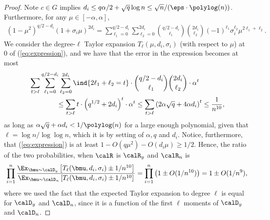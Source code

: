 \begin{proof}
Note $c \in G$ implies $d_i \leq q \alpha/2 + \sqrt{q} \log n \leq \sqrt{n} / (\eps \cdot \polylog(n))$. 
        Furthermore, for any $\mu \in [-\alpha, \alpha]$, %
    \begin{align}
    \left(1 - \mu^2\right)^{q/2 - d_i}\left(1+ \sigma_i \mu\right)^{2d_i} = \sum_{\ell_1 = 0}^{q/2-d_i} \sum_{\ell_2 = 0}^{2d_i} \binom{q/2-d_i}{\ell_1} \binom{2d_i}{\ell_2} (-1)^{\ell_1} \sigma_i^{\ell_2} \mu^{2\ell_1 + \ell_2}. \label{eq:expression} \end{align}
    We consider the degree-$\ell$ Taylor expansion $T_{\ell}(\mu,d_i,\sigma_i)$ (with respect to $\mu$) at $0$ of (\ref{eq:expression}), and we have that the error in the expression becomes at most
    \begin{align*} 
    &\sum_{t > \ell} \sum_{\ell_1=0}^{q/2-d_i} \sum_{\ell_2=0}^{2d_i} \ind\{ 2\ell_1 + \ell_2 = t \} \cdot \binom{q/2-d_i}{\ell_1} \binom{2d_i}{\ell_2} \cdot \alpha^{t} \\
        &\qquad\qquad \leq \sum_{t > \ell} t\cdot \left( q^{1/2} + 2d_i\right)^{t} \cdot \alpha^{t} \leq \sum_{t > \ell} \left( 2\alpha \sqrt{q} + 4\alpha d_i  \right)^{t} %
        \leq \frac{1}{n^{10}},
    \end{align*}
    as long as $\alpha \sqrt{q} + \alpha d_i < 1 / \polylog(n)$ for a large enough polynomial, given that $\ell=\log n / \log \log n $, which it is by setting of $\alpha, q$ and $d_i$. Notice, furthermore, that (\ref{eq:expression}) is at least $1 - O(q\mu^2) - O(d_i \mu) \geq 1/2$. Hence, the ratio of the two probabilities, when $\calR$ is $\calR_y$ and $\calR_n$ is
    \begin{align*}
        \prod_{i=1}^n \dfrac{\Ex_{\bmu \sim \calD_y}\left[ T_{\ell}(\bmu, d_i,\sigma_i) \pm 1/n^{10}\right]}{\Ex_{\bmu \sim \calD_n}\left[ T_{\ell}(\bmu, d_i,\sigma_i) \pm 1/n^{10}\right]}=\prod_{i=1}^n \left(1\pm O(1/n^{10})\right) = 1 \pm O(1 / n^{9}),
    \end{align*}
    where we used the fact that the expected Taylor expansion to degree $\ell$ is equal for $\calD_y$ and $\calD_n$, since it is a function of the first $\ell$ moments of $\calD_y$ and $\calD_n$. 
\end{proof}
